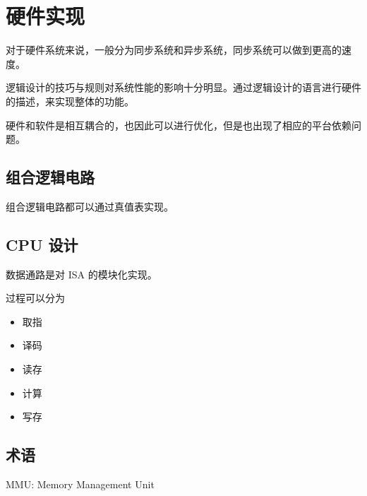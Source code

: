 \documentclass[cn,11pt,chinese,black,simple]{../elegantbook}
\begin{document}
\fi 
\def\chapname{06hw}

\chapter{硬件实现}

对于硬件系统来说，一般分为同步系统和异步系统，同步系统可以做到更高的速度。


逻辑设计的技巧与规则对系统性能的影响十分明显。通过逻辑设计的语言进行硬件的描述，来实现整体的功能。


硬件和软件是相互耦合的，也因此可以进行优化，但是也出现了相应的平台依赖问题。


\section{组合逻辑电路}

组合逻辑电路都可以通过真值表实现。


\section{CPU 设计}

数据通路是对 ISA 的模块化实现。

过程可以分为 

\begin{itemize}
    \item 取指
    \item 译码
    \item 读存
    \item 计算
    \item 写存
\end{itemize}

\section*{术语}

MMU: Memory Management Unit




\let\chapname\undefined
\ifx\mainclass\undefined
\end{document}
